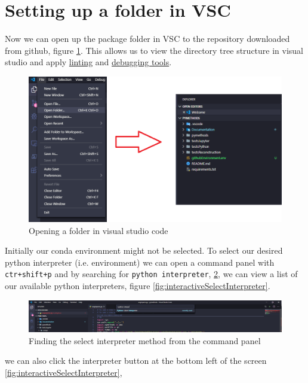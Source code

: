 \documentclass[10pt,a4paper]{article}
\begin{document}
	\section{Setting up a folder in VSC}
		Now we can open up the package folder in VSC to the repository downloaded from github, figure \ref{fig:openFolder}. This allows us to view the directory tree structure in visual studio and apply \href{https://code.visualstudio.com/docs/python/linting}{linting} and \href{https://code.visualstudio.com/docs/python/debugging}{debugging tools}.
		\begin{figure}[h]
			\centering
			\includegraphics[scale=0.5]{figures/folder.PNG}
			\caption{Opening a folder in visual studio code}
			\label{fig:openFolder}
		\end{figure}

		Initially our conda environment might not be selected. To select our desired python interpreter (i.e. environment) we can open a command panel with \verb|ctr+shift+p| and by searching for \verb|python interpreter|, \ref{fig:selectInterpreterCommandPanel}, we can view a list of our available python interpreters, figure \ref{fig:interactiveSelectInterpreter}.

		\begin{figure}[h]
			\centering
			\includegraphics[scale=0.3]{figures/select_interporeter_A.PNG}
			\caption{Finding the select interpreter method from the command panel}
			\label{fig:selectInterpreterCommandPanel}
		\end{figure}

	 	we can also click the interpreter button at the bottom left of the screen \ref{fig:interactiveSelectInterpreter},
\end{document}
